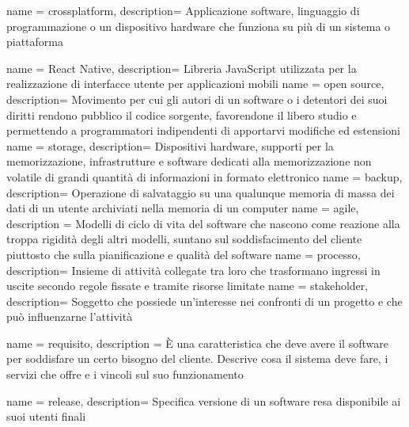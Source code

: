 
 {
  name = crossplatform,
  description={
		Applicazione software, linguaggio di programmazione o un dispositivo hardware che funziona su più di un sistema o piattaforma}
}

 {
  name = React Native,
  description={
		Libreria JavaScript utilizzata per la realizzazione di interfacce utente per applicazioni mobili}
}
 {
  name = open source,
  description={
		Movimento per cui gli autori di un software o i detentori dei suoi diritti rendono pubblico il codice sorgente, favorendone il libero studio e permettendo a programmatori indipendenti di apportarvi modifiche ed estensioni}
}
 {
  name = storage,
  description={
		Dispositivi hardware, supporti per la memorizzazione, infrastrutture e software dedicati alla memorizzazione non volatile di grandi quantità di informazioni in formato elettronico}
}
 {
  name = backup,
  description={
		Operazione di salvataggio su una qualunque memoria di massa dei dati di un utente archiviati nella memoria di un computer}
}
 {
  name = agile,
  description = {
		Modelli di ciclo di vita del software che nascono come reazione alla troppa rigidità degli altri modelli, suntano sul soddisfacimento del cliente piuttosto che sulla pianificazione e qualità del software}
}
 {
  name = processo,
  description={
		Insieme di attività collegate tra loro che trasformano ingressi in uscite secondo regole fissate e tramite risorse limitate}
}
 {
  name = stakeholder,
  description={
  		Soggetto che possiede un'interesse nei confronti di un progetto e che può influenzarne l'attività}
}

 {
  name = requisito,
  description = {
		È una caratteristica che deve avere il software per soddisfare un certo bisogno del cliente. Descrive cosa il sistema deve fare, i servizi che offre e i vincoli sul suo funzionamento}
}

 {
  name = release,
  description={
		Specifica versione di un software resa disponibile ai suoi utenti finali}
}

